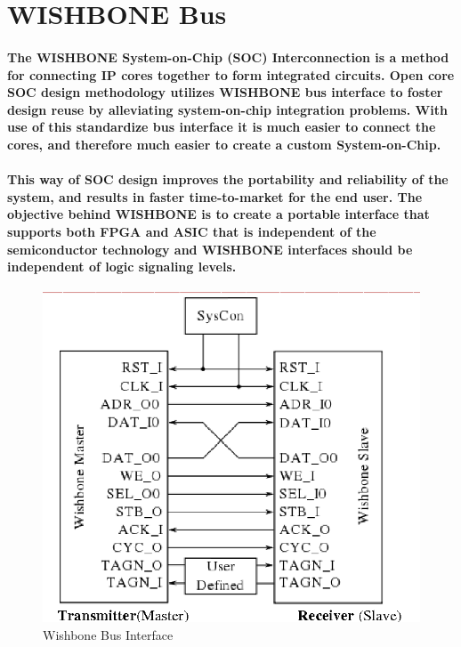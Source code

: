 \documentclass[12pt,a4paper]{report}
\begin{document}
\section{WISHBONE Bus}
\paragraph{\textrm{\textmd{The WISHBONE System-on-Chip (SOC) Interconnection is a method for	connecting IP cores together to form integrated circuits. Open core SOC design methodology utilizes WISHBONE bus interface to foster design reuse by alleviating	system-on-chip integration problems. With use of this standardize bus interface it is much easier to connect the cores, and therefore much easier to create a custom System-on-Chip.}}}
\paragraph{\textrm{\textmd{This way of SOC design improves the portability and reliability of the system, and results in faster time-to-market for the end user. The objective behind WISHBONE is to create a portable interface that supports both FPGA and ASIC that is independent of the 	semiconductor technology and WISHBONE interfaces should be independent of logic signaling levels.}}}
\begin{figure}[h]
	\centering
	\includegraphics[scale=.4]{interface.png}
	\caption{Wishbone Bus Interface}
	\label{fig:ifstage}
\end{figure} 		
\end{document}
